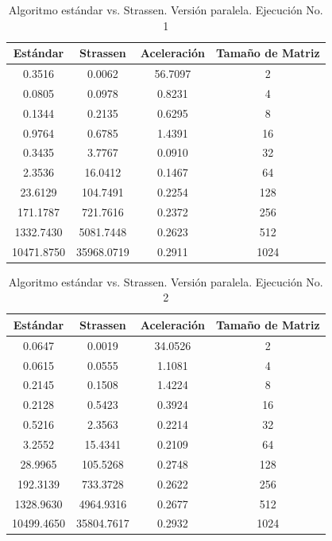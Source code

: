 \documentclass{article}
\begin{document}
\begin{table}[ht]
\centering
\begin{tabular}{|c|c|c|c|}
\hline
\textbf{Estándar} & \textbf{Strassen} & \textbf{Aceleración} & \textbf{Tamaño de Matriz} \\
\hline
0.3516 & 0.0062 & 56.7097 & 2 \\
0.0805 & 0.0978 & 0.8231 & 4 \\
0.1344 & 0.2135 & 0.6295 & 8 \\
0.9764 & 0.6785 & 1.4391 & 16 \\
0.3435 & 3.7767 & 0.0910 & 32 \\
2.3536 & 16.0412 & 0.1467 & 64 \\
23.6129 & 104.7491 & 0.2254 & 128 \\
171.1787 & 721.7616 & 0.2372 & 256 \\
1332.7430 & 5081.7448 & 0.2623 & 512 \\
10471.8750 & 35968.0719 & 0.2911 & 1024 \\
\hline
\end{tabular}
\caption{Algoritmo estándar vs. Strassen. Versión paralela. Ejecución No. 1}
\end{table}

\begin{table}[ht]
\centering
\begin{tabular}{|c|c|c|c|}
\hline
\textbf{Estándar} & \textbf{Strassen} & \textbf{Aceleración} & \textbf{Tamaño de Matriz} \\
\hline
0.0647 & 0.0019 & 34.0526 & 2 \\
0.0615 & 0.0555 & 1.1081 & 4 \\
0.2145 & 0.1508 & 1.4224 & 8 \\
0.2128 & 0.5423 & 0.3924 & 16 \\
0.5216 & 2.3563 & 0.2214 & 32 \\
3.2552 & 15.4341 & 0.2109 & 64 \\
28.9965 & 105.5268 & 0.2748 & 128 \\
192.3139 & 733.3728 & 0.2622 & 256 \\
1328.9630 & 4964.9316 & 0.2677 & 512 \\
10499.4650 & 35804.7617 & 0.2932 & 1024 \\
\hline
\end{tabular}
\caption{Algoritmo estándar vs. Strassen. Versión paralela. Ejecución No. 2}
\end{table}
\end{document}
